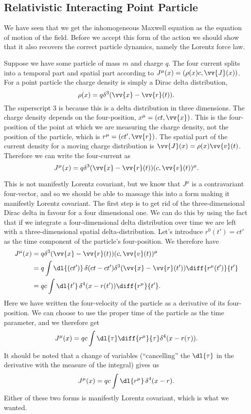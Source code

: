 \subsection{Relativistic Interacting Point Particle}
We have seen that we get the inhomogeneous Maxwell equation as the equation of motion of the field.
Before we accept this form of the action we should show that it also recovers the correct particle dynamics, namely the Lorentz force law.

Suppose we have some particle of mass \(m\) and charge \(q\).
The four current splits into a temporal part and spatial part according to \(J^\mu(x) = (\rho(x)c, \vv{J}(x))\).
For a point particle the charge density is simply a Dirac delta distribution,
\begin{equation}
    \rho(x) = q \delta^3(\vv{x} - \vv{r}(t)).
\end{equation}
The superscript 3 is because this is a delta distribution in three dimensions.
The charge density depends on the four-position, \(x^\mu = (ct, \vv{x})\).
This is the four-position of the point at which we are measuring the charge density, not the position of the particle, which is \(r^\mu = (ct', \vv{r})\).
The spatial part of the current density for a moving charge distribution is \(\vv{J}(x) = \rho(x)\vv{v}(t)\).
Therefore we can write the four-current as
\begin{equation}
    J^\mu(x) = q\delta^3(\vv{x} - \vv{r}(t))(c, \vv{v}(t))^\mu.
\end{equation}

This is not manifestly Lorentz covariant, but we know that \(J^\mu\) is a contravariant four-vector, and so we should be able to massage this into a form making it manifestly Lorentz covariant.
The first step is to get rid of the three-dimensional Dirac delta in favour for a four dimensional one.
We can do this by using the fact that if we integrate a four-dimensional delta distribution over time we are left with a three-dimensional spatial delta-distribution.
Let's introduce \(r^0(t') = ct'\) as the time component of the particle's four-position.
We therefore have
\begin{align}
    J^\mu(x) &= q \delta^3(\vv{x} - \vv{r}(t))(c, \vv{v}(t))^\mu\\
    &= q \int \dl{(ct')} \, \delta(ct - ct') \delta^3(\vv{x} - \vv{r}(t')) \diff{r^\mu(t')}{t'}\\
    &= qc \int \dl{t'} \, \delta^4(x - r(t')) \diff{r^\mu}{t'}.
\end{align}
Here we have written the four-velocity of the particle as a derivative of its four-position.
We can choose to use the proper time of the particle as the time parameter, and we therefore get
\begin{equation}
    J^\mu(x) = qc \int \dl{\tau} \diff{r^\mu}{\tau} \delta^4(x - r(\tau)).
\end{equation}
It should be noted that a change of variables (\enquote{cancelling} the \(\dl{\tau}\) in the derivative with the measure of the integral) gives us
\begin{equation}
    J^\mu(x) = qc \int \dl{r^\mu} \, \delta^4(x - r).
\end{equation}
Either of these two forms is manifestly Lorentz covariant, which is what we wanted.

